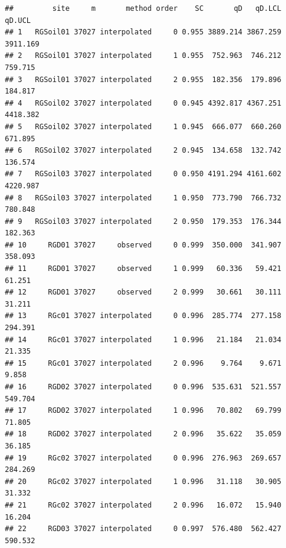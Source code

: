 \documentclass[]{article}
\newenvironment{Shaded}{\begin{snugshade}}{\end{snugshade}}
\newcommand{\CommentTok}[1]{\textcolor[rgb]{0.56,0.35,0.01}{\textit{#1}}}
\newcommand{\DataTypeTok}[1]{\textcolor[rgb]{0.13,0.29,0.53}{#1}}
\newcommand{\DecValTok}[1]{\textcolor[rgb]{0.00,0.00,0.81}{#1}}
\newcommand{\KeywordTok}[1]{\textcolor[rgb]{0.13,0.29,0.53}{\textbf{#1}}}
\newcommand{\NormalTok}[1]{#1}
\newcommand{\StringTok}[1]{\textcolor[rgb]{0.31,0.60,0.02}{#1}}
\begin{document}
\begin{Shaded}
\end{Shaded}

\begin{verbatim}
##         site     m       method order    SC       qD   qD.LCL   qD.UCL
## 1   RGSoil01 37027 interpolated     0 0.955 3889.214 3867.259 3911.169
## 2   RGSoil01 37027 interpolated     1 0.955  752.963  746.212  759.715
## 3   RGSoil01 37027 interpolated     2 0.955  182.356  179.896  184.817
## 4   RGSoil02 37027 interpolated     0 0.945 4392.817 4367.251 4418.382
## 5   RGSoil02 37027 interpolated     1 0.945  666.077  660.260  671.895
## 6   RGSoil02 37027 interpolated     2 0.945  134.658  132.742  136.574
## 7   RGSoil03 37027 interpolated     0 0.950 4191.294 4161.602 4220.987
## 8   RGSoil03 37027 interpolated     1 0.950  773.790  766.732  780.848
## 9   RGSoil03 37027 interpolated     2 0.950  179.353  176.344  182.363
## 10     RGD01 37027     observed     0 0.999  350.000  341.907  358.093
## 11     RGD01 37027     observed     1 0.999   60.336   59.421   61.251
## 12     RGD01 37027     observed     2 0.999   30.661   30.111   31.211
## 13     RGc01 37027 interpolated     0 0.996  285.774  277.158  294.391
## 14     RGc01 37027 interpolated     1 0.996   21.184   21.034   21.335
## 15     RGc01 37027 interpolated     2 0.996    9.764    9.671    9.858
## 16     RGD02 37027 interpolated     0 0.996  535.631  521.557  549.704
## 17     RGD02 37027 interpolated     1 0.996   70.802   69.799   71.805
## 18     RGD02 37027 interpolated     2 0.996   35.622   35.059   36.185
## 19     RGc02 37027 interpolated     0 0.996  276.963  269.657  284.269
## 20     RGc02 37027 interpolated     1 0.996   31.118   30.905   31.332
## 21     RGc02 37027 interpolated     2 0.996   16.072   15.940   16.204
## 22     RGD03 37027 interpolated     0 0.997  576.480  562.427  590.532

\end{verbatim}
\end{document}
